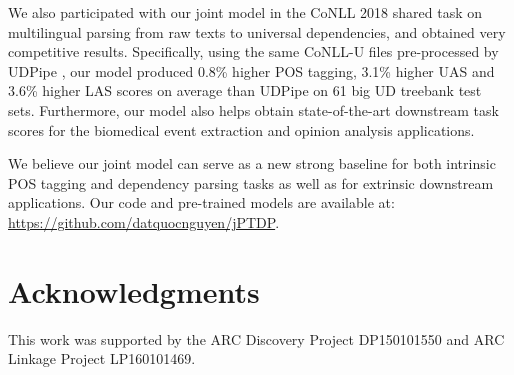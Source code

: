 \documentclass[11pt,letterpaper]{article}
\begin{document}
We also participated with our joint model in the CoNLL 2018 shared task on multilingual parsing from raw texts to universal dependencies, and obtained very competitive results. Specifically, using the same  CoNLL-U files pre-processed by UDPipe \citep{udpipe:2017},  our  model produced   0.8\% higher  POS tagging, 3.1\% higher UAS and  3.6\% higher LAS  scores  on average than UDPipe on 61 big UD treebank test sets. 
Furthermore, our model also helps obtain state-of-the-art downstream task scores for the biomedical event extraction and opinion analysis applications.  

We believe our joint model can serve as a new strong baseline for both intrinsic POS tagging and dependency parsing tasks as well as for extrinsic downstream applications. Our code and pre-trained models are available at: \url{https://github.com/datquocnguyen/jPTDP}.



\section*{Acknowledgments}   
This work was supported by the ARC Discovery Project DP150101550 and ARC Linkage Project LP160101469. 






\end{document}
